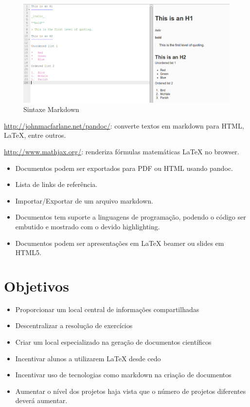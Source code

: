 \begin{figure}
    \includegraphics[scale=0.45]{img/markdown.png}
    \caption{Sintaxe Markdown}
\end{figure}

\url{http://johnmacfarlane.net/pandoc/}: converte textos em markdown
para HTML, LaTeX, entre outros.

\url{http://www.mathjax.org/}: renderiza fórmulas matemáticas LaTeX no
browser.

\begin{itemize}
\item
  Documentos podem ser exportados para PDF ou HTML usando pandoc.
\item
  Lista de links de referência.
\item
  Importar/Exportar de um arquivo markdown.
\item
  Documentos tem suporte a linguagens de programação, podendo o código
  ser embutido e mostrado com o devido highlighting.
\item
  Documentos podem ser apresentações em LaTeX beamer ou slides em HTML5.
\end{itemize}
\section{Objetivos}

\begin{itemize}
\item
  Proporcionar um local central de informações compartilhadas
\item
  Descentralizar a resolução de exercícios
\item
  Criar um local especializado na geração de documentos científicos
\item
  Incentivar alunos a utilizarem LaTeX desde cedo
\item
  Incentivar uso de tecnologias como markdown na criação de documentos
\item
  Aumentar o nível dos projetos haja vista que o número de projetos
  diferentes deverá aumentar.
\end{itemize}
